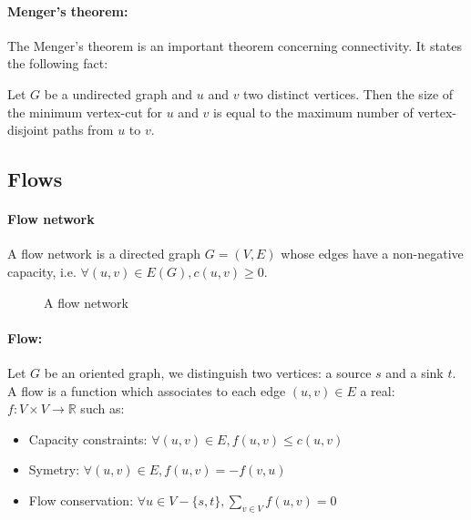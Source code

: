 \paragraph{Menger's theorem:}
The Menger's theorem is an important theorem concerning connectivity.
It states the following fact:

Let $G$ be a undirected graph and $u$ and $v$ two distinct vertices.
Then the size of the minimum vertex-cut for $u$ and $v$ is equal to the
maximum number of vertex-disjoint paths from $u$ to $v$.



\subsection{Flows}
\paragraph{Flow network}
A flow network is a directed graph $G=(V,E)$ whose edges have a non-negative
capacity, i.e. $\forall (u,v) \in E(G), c(u,v) \geq 0$.

\begin{figure}[!h]
  \caption{A flow network}
  \begin{center}
    
  \end{center}
\end{figure}

\paragraph{Flow:}
Let $G$ be an oriented graph, we distinguish two vertices: a source $s$ and a
sink $t$.
A flow is a function which associates to each edge $(u,v) \in E$ a real:
$f: V \times V \rightarrow \mathbb{R}$ such as:
\begin{itemize}
    \item Capacity constraints: $\forall (u,v) \in E, f(u,v) \leq c(u,v)$
    \item Symetry: $\forall (u,v) \in E, f(u,v) = - f(v,u) $
    \item Flow conservation: $\forall u \in V - \{s,t\}, \sum_{v \in V}f(u,v) = 0$ 
\end{itemize}


